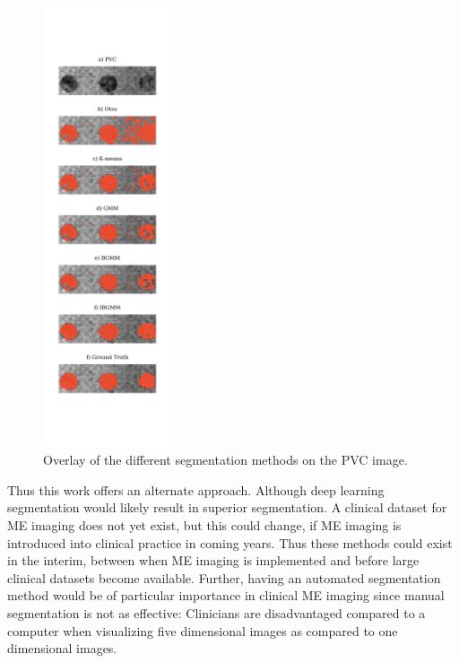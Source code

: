 \documentclass[a4paper,11pt]{article}
\begin{document}
\begin{figure}
  
  \begin{center}
    \includegraphics[width=0.33\textwidth]{figures/otsu.png}
  \end{center}
  
  \caption{Overlay of the different segmentation methods on the PVC image.}
  
  \label{results:otsu}
\end{figure}

Thus this work offers an alternate approach. Although deep learning segmentation \cite{Ronneberger2015U-Net:Segmentation} would likely result in superior segmentation. A clinical dataset for ME imaging does not yet exist, but this could change, if ME imaging is introduced into clinical practice in coming years. Thus these methods could exist in the interim, between when ME imaging is implemented and before large clinical datasets become available. Further, having an automated segmentation method would be of particular importance in clinical ME imaging since manual segmentation is not as effective: Clinicians are disadvantaged compared to a computer when visualizing five dimensional images as compared to one dimensional images.
\end{document}
